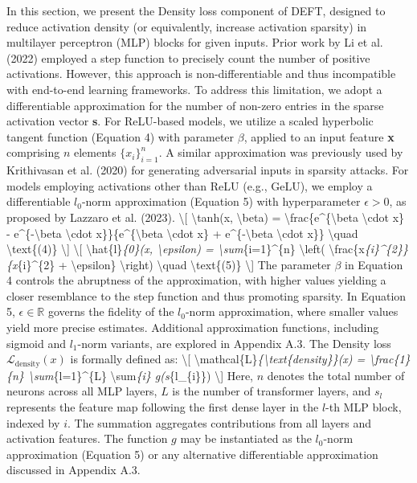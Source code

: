 \documentclass[conference]{IEEEtran}
\begin{document}
In this section, we present the Density loss component of DEFT, designed to reduce activation density (or equivalently, increase activation sparsity) in multilayer perceptron (MLP) blocks for given inputs. Prior work by Li et al. (2022) employed a step function to precisely count the number of positive activations. However, this approach is non-differentiable and thus incompatible with end-to-end learning frameworks. To address this limitation, we adopt a differentiable approximation for the number of non-zero entries in the sparse activation vector \textbf{s}. For ReLU-based models, we utilize a scaled hyperbolic tangent function (Equation 4) with parameter \(\beta\), applied to an input feature \textbf{x} comprising \(n\) elements \(\{x_{i}\}_{i=1}^{n}\). A similar approximation was previously used by Krithivasan et al. (2020) for generating adversarial inputs in sparsity attacks. For models employing activations other than ReLU (e.g., GeLU), we employ a differentiable \(l_{0}\)-norm approximation (Equation 5) with hyperparameter \(\epsilon > 0\), as proposed by Lazzaro et al. (2023). \textbackslash{}[ \textbackslash{}tanh(x, \textbackslash{}beta) = \textbackslash{}frac\{e\textasciicircum{}\{\textbackslash{}beta \textbackslash{}cdot x\} - e\textasciicircum{}\{-\textbackslash{}beta \textbackslash{}cdot x\}\}\{e\textasciicircum{}\{\textbackslash{}beta \textbackslash{}cdot x\} + e\textasciicircum{}\{-\textbackslash{}beta \textbackslash{}cdot x\}\} \textbackslash{}quad \textbackslash{}text\{(4)\} \textbackslash{}] \textbackslash{}[ \textbackslash{}hat\{l\}\textit{\{0\}(x, \textbackslash{}epsilon) = \textbackslash{}sum}\{i=1\}\textasciicircum{}\{n\} \textbackslash{}left( \textbackslash{}frac\{x\textit{\{i\}\textasciicircum{}\{2\}\}\{x}\{i\}\textasciicircum{}\{2\} + \textbackslash{}epsilon\} \textbackslash{}right) \textbackslash{}quad \textbackslash{}text\{(5)\} \textbackslash{}] The parameter \(\beta\) in Equation 4 controls the abruptness of the approximation, with higher values yielding a closer resemblance to the step function and thus promoting sparsity. In Equation 5, \(\epsilon \in \mathbb{R}\) governs the fidelity of the \(l_{0}\)-norm approximation, where smaller values yield more precise estimates. Additional approximation functions, including sigmoid and \(l_{1}\)-norm variants, are explored in Appendix A.3. The Density loss \(\mathcal{L}_{\text{density}}(x)\) is formally defined as: \textbackslash{}[ \textbackslash{}mathcal\{L\}\textit{\{\textbackslash{}text\{density\}\}(x) = \textbackslash{}frac\{1\}\{n\} \textbackslash{}sum}\{l=1\}\textasciicircum{}\{L\} \textbackslash{}sum\textit{\{i\} g(s}\{l\_\{i\}\}) \textbackslash{}] Here, \(n\) denotes the total number of neurons across all MLP layers, \(L\) is the number of transformer layers, and \(s_{l}\) represents the feature map following the first dense layer in the \(l\)-th MLP block, indexed by \(i\). The summation aggregates contributions from all layers and activation features. The function \(g\) may be instantiated as the \(l_{0}\)-norm approximation (Equation 5) or any alternative differentiable approximation discussed in Appendix A.3.
\end{document}
